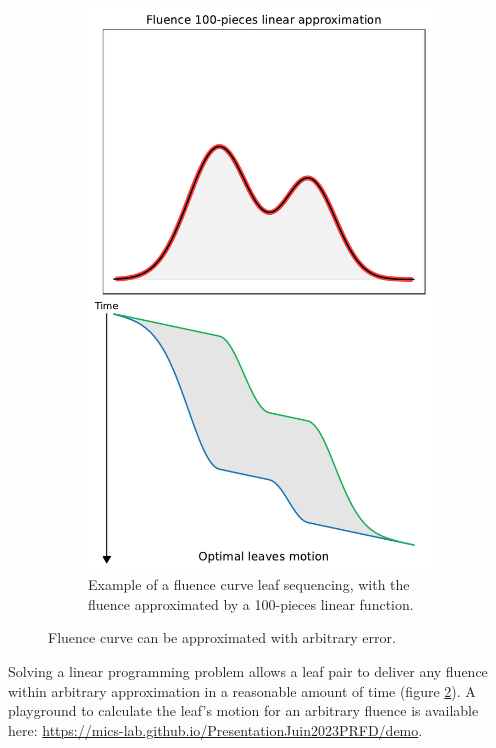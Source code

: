 \begin{figure}
\begin{subfigure}[b]{0.17\textwidth}
		\vspace{0cm}
	\end{subfigure}
	\begin{subfigure}[b]{0.4\textwidth}
		\includegraphics[width=\linewidth]{_fluence_leaf_sequencing_100.pdf}
		\caption{Example of a fluence curve leaf sequencing, with the fluence approximated by a 100-pieces linear function.}
		\label{fig:fluence_leaf_sequencing_100}
	\end{subfigure}
	\caption{Fluence curve can be approximated with arbitrary error.}
	\label{fig:fluence_leaf_sequencing}
\end{figure}
Solving a linear programming problem allows a leaf pair to deliver any fluence within arbitrary approximation in a reasonable amount of time (figure \ref{fig:fluence_leaf_sequencing}).
A playground to calculate the leaf's motion for an arbitrary fluence is available here:
\url{https://mics-lab.github.io/PresentationJuin2023PRFD/demo}.

